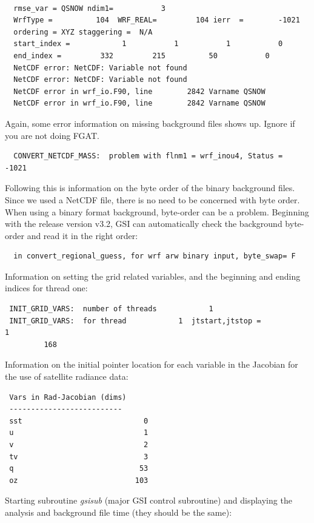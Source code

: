 \begin{scriptsize}
\begin{verbatim}
 
  rmse_var = QSNOW ndim1=           3
  WrfType =          104  WRF_REAL=         104 ierr  =        -1021
  ordering = XYZ staggering =  N/A
  start_index =            1           1           1           0  
  end_index =         332         215          50           0
  NetCDF error: NetCDF: Variable not found
  NetCDF error: NetCDF: Variable not found
  NetCDF error in wrf_io.F90, line        2842 Varname QSNOW
  NetCDF error in wrf_io.F90, line        2842 Varname QSNOW

\end{verbatim}
\end{scriptsize}
Again, some error information on missing background files shows up. Ignore if you are not doing FGAT.
\begin{scriptsize}
\begin{verbatim}
  CONVERT_NETCDF_MASS:  problem with flnm1 = wrf_inou4, Status =        -1021
\end{verbatim}
\end{scriptsize}

Following this is information on the byte order of the binary background files. Since we used a NetCDF file, there is no need to be concerned with byte order. When using a binary format background, byte-order can be a problem. Beginning with the release version v3.2, GSI can automatically check the background byte-order and read it in the right order:

\begin{scriptsize}
\begin{verbatim}
  in convert_regional_guess, for wrf arw binary input, byte_swap= F
\end{verbatim}
\end{scriptsize}
Information on setting the grid related variables, and the beginning and ending indices for thread one:
\begin{scriptsize}
\begin{verbatim}
 INIT_GRID_VARS:  number of threads            1
 INIT_GRID_VARS:  for thread            1  jtstart,jtstop =            1
         168
\end{verbatim}
\end{scriptsize} 
Information on the initial pointer location for each variable in the Jacobian for the use of satellite radiance data: 
\begin{scriptsize}
\begin{verbatim}
 Vars in Rad-Jacobian (dims)
 --------------------------
 sst                            0
 u                              1
 v                              2
 tv                             3
 q                             53
 oz                           103
\end{verbatim}
\end{scriptsize}
Starting subroutine \textit{gsisub} (major GSI control subroutine) and displaying the analysis and background file time (they should be the same):

